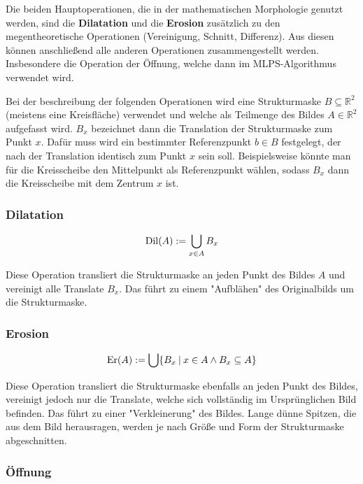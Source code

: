 \documentclass{article}
\newcommand{\R}[0]{\mathbb{R}}
\begin{document}
Die beiden Hauptoperationen, die in der mathematischen Morphologie genutzt werden, sind die \textbf{Dilatation} und die \textbf{Erosion} zusätzlich zu den megentheoretische Operationen (Vereinigung, Schnitt, Differenz).
Aus diesen können anschließend alle anderen Operationen zusammengestellt werden. Insbesondere die Operation der Öffnung, welche dann im MLPS-Algorithmus verwendet wird.


Bei der beschreibung der folgenden Operationen wird eine Strukturmaske $B \subseteq \R^2$ (meistens eine Kreisfläche) verwendet und welche als Teilmenge des Bildes $A \in \R^2$ aufgefasst wird.
$B_x$ bezeichnet dann die Translation der Strukturmaske zum Punkt $x$. Dafür muss wird ein bestimmter Referenzpunkt $b \in B$ festgelegt, der nach der Translation identisch zum Punkt $x$ sein soll.
Beispielsweise könnte man für die Kreisscheibe den Mittelpunkt als Referenzpunkt wählen, sodass $B_x$ dann die Kreisscheibe mit dem Zentrum $x$ ist.

\subsubsection{Dilatation}
\begin{equation}
    {\rm Dil}(A) := \bigcup\limits_{x \in A} B_x
\end{equation}

Diese Operation transliert die Strukturmaske an jeden Punkt des Bildes $A$ und vereinigt alle Translate $B_x$. Das führt zu einem "Aufblähen" des Originalbilds um die Strukturmaske.

\subsubsection{Erosion}
\begin{equation}
    {\rm Er}(A) := \bigcup \{B_x \: | \: x \in A \land B_x \subseteq A\}
\end{equation}

Diese Operation transliert die Strukturmaske ebenfalls an jeden Punkt des Bildes, vereinigt jedoch nur die Translate, welche sich vollständig im Ursprünglichen Bild befinden.
Das führt zu einer "Verkleinerung" des Bildes. Lange dünne Spitzen, die aus dem Bild herausragen, werden je nach Größe und Form der Strukturmaske abgeschnitten.

\subsubsection{Öffnung}
\end{document}
